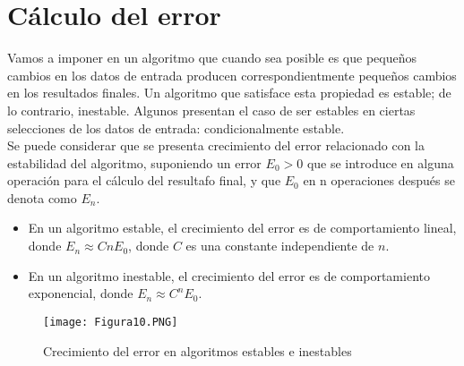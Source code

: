 \documentclass{article}
\begin{document}
\section{Cálculo del error}
Vamos a imponer en un algoritmo que cuando sea posible es que pequeños cambios en los datos de entrada producen correspondientmente pequeños cambios en los resultados finales. Un algoritmo que satisface esta propiedad es estable; de lo contrario, inestable. Algunos presentan el caso de ser estables en ciertas selecciones de los datos de entrada: condicionalmente estable.  
\\
Se puede considerar que se presenta crecimiento del error relacionado con la estabilidad del algoritmo, suponiendo un error $E_0 > 0$ que se introduce en alguna operación para el cálculo del resultafo final, y que $E_0$ en n operaciones después se denota como $E_n$. 
\begin{itemize}
    \item En un algoritmo estable, el crecimiento del error es de comportamiento lineal, donde $E_n \approx CnE_0$, donde $C$ es una constante independiente de $n$.
    \item En un algoritmo inestable, el crecimiento del error es de comportamiento exponencial, donde $E_n \approx C^nE_0$. 
\end{itemize}
\begin{figure}[h]
    \centering
    \texttt{[image: Figura10.PNG]}
    \caption{Crecimiento del error en algoritmos estables e inestables}
    \label{fig:my_label}
\end{figure}
\end{document}
